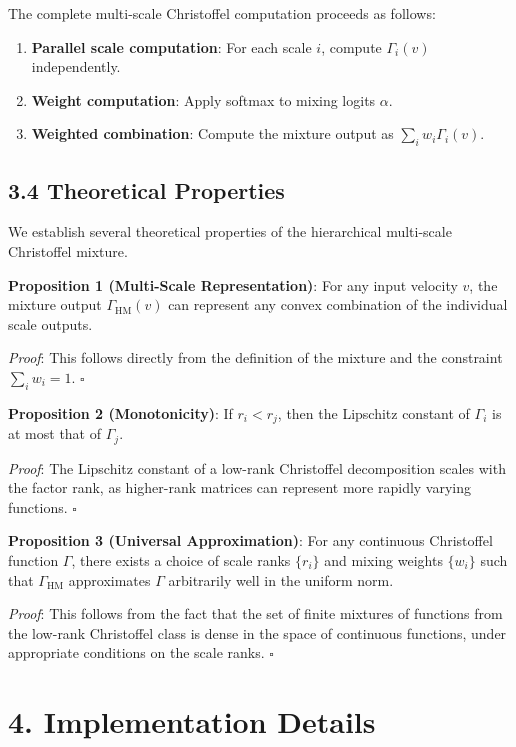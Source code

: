 \documentclass[12pt]{article}
\begin{document}
The complete multi-scale Christoffel computation proceeds as follows:

\begin{enumerate}[label=\arabic*.]
\item \textbf{Parallel scale computation}: For each scale $i$, compute $\Gamma_i(v)$ independently.
\item \textbf{Weight computation}: Apply softmax to mixing logits $\alpha$.
\item \textbf{Weighted combination}: Compute the mixture output as $\sum_i w_i \Gamma_i(v)$.
\end{enumerate}

\subsection{3.4 Theoretical Properties}

We establish several theoretical properties of the hierarchical multi-scale Christoffel mixture.

\textbf{Proposition 1 (Multi-Scale Representation)}: For any input velocity $v$, the mixture output $\Gamma_{\text{HM}}(v)$ can represent any convex combination of the individual scale outputs.

\textit{Proof}: This follows directly from the definition of the mixture and the constraint $\sum_i w_i = 1$. $\square$

\textbf{Proposition 2 (Monotonicity)}: If $r_i < r_j$, then the Lipschitz constant of $\Gamma_i$ is at most that of $\Gamma_j$.

\textit{Proof}: The Lipschitz constant of a low-rank Christoffel decomposition scales with the factor rank, as higher-rank matrices can represent more rapidly varying functions. $\square$

\textbf{Proposition 3 (Universal Approximation)}: For any continuous Christoffel function $\Gamma$, there exists a choice of scale ranks $\{r_i\}$ and mixing weights $\{w_i\}$ such that $\Gamma_{\text{HM}}$ approximates $\Gamma$ arbitrarily well in the uniform norm.

\textit{Proof}: This follows from the fact that the set of finite mixtures of functions from the low-rank Christoffel class is dense in the space of continuous functions, under appropriate conditions on the scale ranks. $\square$

\section{4. Implementation Details}
\end{document}
